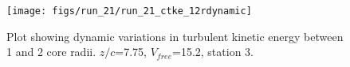 \begin{figure}[H]
\centering
\texttt{[image: figs/run\_21/run\_21\_ctke\_12rdynamic]}
\caption{Plot showing dynamic variations in turbulent kinetic energy between 1 and 2 core radii. $z/c$=7.75, $V_{free}$=15.2, station 3.}
\label{fig:run_21_ctke_12rdynamic}
\end{figure}


